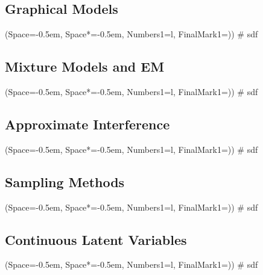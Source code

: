 \documentclass[12pt, a4paper]{article}
\newcommand{\listSpace}{-0.5em}%
\begin{document}
\subsection{Graphical Models}
\begin{easylist}[itemize]
	\ListProperties(Space=\listSpace, Space*=\listSpace, Numbers1=l, FinalMark1={)})
	# sdf
\end{easylist}

\subsection{Mixture Models and EM}
\begin{easylist}[itemize]
	\ListProperties(Space=\listSpace, Space*=\listSpace, Numbers1=l, FinalMark1={)})
	# sdf
\end{easylist}

\subsection{Approximate Interference}
\begin{easylist}[itemize]
	\ListProperties(Space=\listSpace, Space*=\listSpace, Numbers1=l, FinalMark1={)})
	# sdf
\end{easylist}

\subsection{Sampling Methods}
\begin{easylist}[itemize]
	\ListProperties(Space=\listSpace, Space*=\listSpace, Numbers1=l, FinalMark1={)})
	# sdf
\end{easylist}

\subsection{Continuous Latent Variables}
\begin{easylist}[itemize]
	\ListProperties(Space=\listSpace, Space*=\listSpace, Numbers1=l, FinalMark1={)})
	# sdf
\end{easylist}

\end{document}
